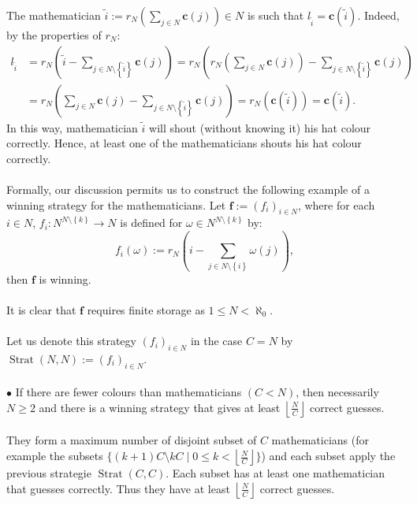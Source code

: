 \documentclass[11pt, a4paper, oneside]{article}
\theoremstyle{remark}
\theoremstyle{lemma}
\begin{document}
The mathematician \(\tilde{i} := r_{N}\left(\sum_{j \in N} \mathbf{c}(j)\right) \in N\) is such that \(l_{\tilde{i}} = \mathbf{c}(\tilde{i})\). Indeed, by the properties of \(r_N\):
\begin{align*}
l_{\tilde{i}} &= r_{N}\left(\tilde{i} - \sum_{j \in N \setminus \left\{\tilde{i}\right\}} \mathbf{c}(j)\right) = r_{N}\left(r_{N}\left(\sum_{j \in N} \mathbf{c}(j)\right) - \sum_{j \in N \setminus \left\{\tilde{i}\right\}} \mathbf{c}(j)\right) \\
&= r_{N}\left(\sum_{j \in N} \mathbf{c}(j) - \sum_{j \in N \setminus \left\{\tilde{i}\right\}} \mathbf{c}(j)\right) = r_{N}\left(\mathbf{c}(\tilde{i})\right) = \mathbf{c}(\tilde{i}).
\end{align*}
In this way, mathematician \(\tilde{i}\) will shout (without knowing it) his hat colour correctly. Hence, at least one of the mathematicians shouts his hat colour correctly.
\\\\
Formally, our discussion permits us to construct the following example of a winning strategy for the mathematicians. Let \(\mathbf{f} := \left( f_i \right)_{i \in N}\), where for each \(i \in N\), \(f_i : N^{N \setminus \left\{k\right\}} \rightarrow N\) is defined for \(\omega \in N^{N \setminus \left\{k\right\}}\) by:
\[
f_i(\omega) := r_{N}\left(i - \sum_{j \in N \setminus \left\{i\right\}} \omega(j)\right),
\]
then \(\mathbf{f}\) is winning.
\\\\
It is clear that \(\mathbf{f}\) requires finite storage as \(1 \leq N < \aleph_0\).
\\\\
Let us denote this strategy \(\left(f_i\right)_{i \in N}\) in the case \(C = N\) by \(\operatorname{Strat}(N, N) := \left(f_i\right)_{i \in N}\).
\\\\
$\bullet$ If there are fewer colours than mathematicians \(\left(C < N\right)\), then necessarily \(N \geq 2\) and there is a winning strategy that gives at least $\left\lfloor\frac{N}{C}\right\rfloor$ correct guesses.
\\\\
They form a maximum number of disjoint subset of $C$ mathematicians (for example the subsets $\{(k+1)C\setminus kC\mid 0\leq k<\left\lfloor\frac{N}{C}\right\rfloor\}$) and each subset apply the previous strategie $\operatorname{Strat}(C, C)$. Each subset has at least one mathematician that guesses correctly. Thus they have at least $\left\lfloor\frac{N}{C}\right\rfloor$ correct guesses. 
\end{document}
